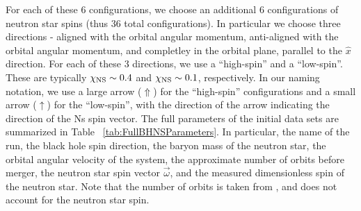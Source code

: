 For each of these 6
configurations, we choose an additional 6 configurations of neutron
star spins (thus 36 total configurations). In particular we choose
three directions - aligned with the orbital angular momentum,
anti-aligned with the orbital angular momentum, and completley in the
orbital plane, parallel to the $\hat{x}$ direction. For each of these
3 directions, we use a ``high-spin'' and a ``low-spin''. These are
typically $\chi_{\rm NS}\sim 0.4$ and $\chi_{\rm NS}\sim 0.1$,
respectively. In our naming notation, we use a large arrow
($\Uparrow$)  for the ``high-spin'' configurations and a small arrow
($\uparrow$) for the ``low-spin'', with the direction of the arrow
indicating the direction of the Ns spin vector. The full parameters of
the initial data sets are summarized in Table
~\ref{tab:FullBHNSParameters}. In particular, the name of the run,
the black hole spin direction, the baryon mass of the neutron star, the orbital angular velocity of the system,
the approximate number of orbits before merger, the neutron star spin vector $\vec{\omega}$, and the measured dimensionless
spin of the neutron star. Note that the number of orbits is taken from
\cite{Foucart:2013a}, and does not account for the neutron star
spin. 

